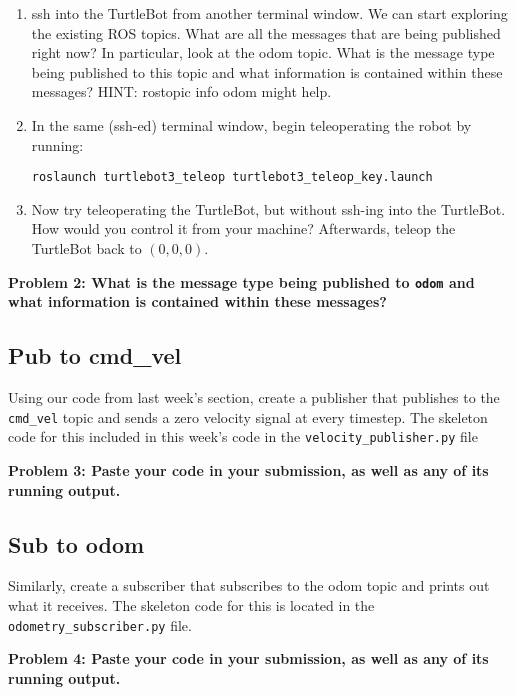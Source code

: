 \documentclass{article}
\begin{document}
\begin{enumerate}
\item ssh into the TurtleBot from another terminal window. We can start exploring the existing ROS topics. What are all the messages that are being published right now? In particular, look at the odom topic. What is the message type being published to this topic and what information is contained within these messages? HINT: rostopic info odom might help.
\item In the same (ssh-ed) terminal window, begin teleoperating the robot by running:
\begin{lstlisting}
roslaunch turtlebot3_teleop turtlebot3_teleop_key.launch
\end{lstlisting}
\item Now try teleoperating the TurtleBot, but without ssh-ing into the TurtleBot. How would you control it from your machine? Afterwards, teleop the TurtleBot back to $(0,0,0)$.
\end{enumerate}

{\bf Problem 2: What is the message type being published to \texttt{odom} and what information is contained within these messages?}

\subsection{Pub to cmd\_vel}
Using our code from last week's section, create a publisher that publishes to the \texttt{cmd\_vel} topic and sends a zero velocity signal at every timestep. The skeleton code for this included in this week's code in the \texttt{velocity\_publisher.py} file

{\bf Problem 3: Paste your code in your submission, as well as any of its running output.}

\subsection{Sub to odom}
Similarly, create a subscriber that subscribes to the odom topic and prints out what it receives. The skeleton code for this is located in the \texttt{odometry\_subscriber.py} file.

{\bf Problem 4: Paste your code in your submission, as well as any of its running output.}
\end{document}
